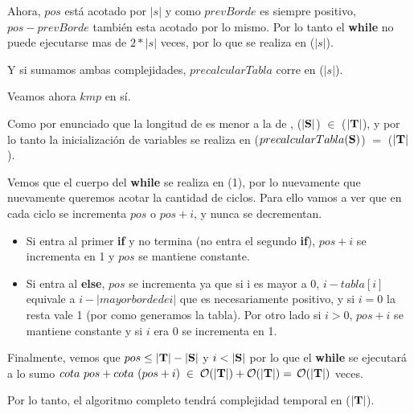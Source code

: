 \begin{algorithmic}
Ahora, $pos$ está acotado por $|s|$ y como $prevBorde$ es siempre positivo, $pos - prevBorde$ también esta acotado por lo mismo. Por lo tanto el \textbf{while} no puede ejecutarse mas de $2 * |s|$ veces, por lo que se realiza en \bigo($|s|$).

Y si sumamos ambas complejidades, $precalcularTabla$ corre en \bigo($|s|$).

\vspace{1em}

Veamos ahora $kmp$ en sí.

Como por enunciado que la longitud de \sS es menor a la de \sT, \bigo($|\textbf{S}|$) $\in$ \bigo($|\textbf{T}|$), y por lo tanto la inicialización de variables se realiza en \bigo($precalcularTabla(\textbf{S})$) $=$ \bigo($|\textbf{T}|$).

Vemos que el cuerpo del \textbf{while} se realiza en \bigo(1), por lo nuevamente que nuevamente queremos acotar la cantidad de ciclos. Para ello vamos a ver que en cada ciclo se incrementa $pos$ o $pos + i$, y nunca se decrementan.

\begin{itemize}
    \item Si entra al primer \textbf{if} y no termina (no entra el segundo \textbf{if}), $pos + i$ se incrementa en 1 y $pos$ se mantiene constante.
    \item Si entra al \textbf{else}, $pos$ se incrementa ya que si i es mayor a 0, $i - tabla[i]$ equivale a $i - |mayor borde de i|$ que es necesariamente positivo, y si $i=0$ la resta vale 1 (por como generamos la tabla). Por otro lado si $i>0$, $pos + i$ se mantiene constante y si $i$ era 0 se incrementa en 1.
\end{itemize}

Finalmente, vemos que $pos \leq |\textbf{T}| - |\textbf{S}|$ y $i < |\textbf{S}|$ por lo que el \textbf{while} se ejecutará a lo sumo $cota\ pos + cota\ (pos+i) \;\in\; \mathcal{O}(|\textbf{T}|) + \mathcal{O}(|\textbf{T}|) = \,\mathcal{O}(|\textbf{T}|)$ veces.

Por lo tanto, el algoritmo completo tendrá complejidad temporal en \bigo($|\textbf{T}|$).

\end{algorithmic}

